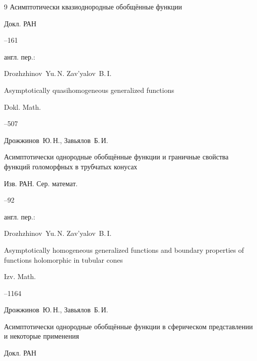 \begin{thebibliography}{9}
\paper Асимптотически квазиоднородные обобщённые функции

\jour Докл. РАН  




--161

\transl англ. пер.:~

\by Drozhzhinov~Yu.\,N. Zav'yalov~B.\,I.

\by Asymptotically quasihomogeneous generalized functions

\jour Dokl. Math.




–507




\by  Дрожжинов~Ю.\,Н., Завьялов~Б.\,И.

\paper  Асимптотически однородные обобщённые функции и граничные свойства функций голоморфных в трубчатых конусах

\jour Изв. РАН. Сер. математ. 




--92 

\transl англ. пер.:~

\by Drozhzhinov~Yu.\,N. Zav'yalov~B.\,I.

\paper Asymptotically homogeneous generalized functions and boundary properties of functions holomorphic in tubular cones

\jour Izv. Math. 



--1164 







\by Дрожжинов~Ю.\,Н., Завьялов~Б.\,И.

\paper Асимптотически однородные обобщённые функции в сферическом представлении и некоторые применения

\jour Докл. РАН  





\end{thebibliography}
